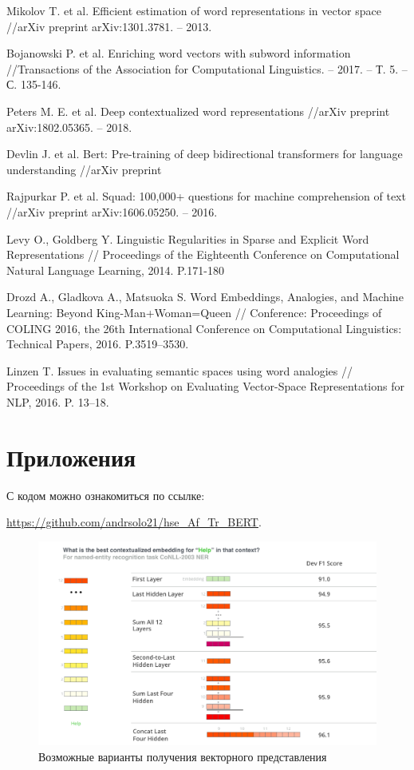\documentclass[a4paper,14pt]{article}
\begin{document}
	\begin{thebibliography}{9} 
		Mikolov T. et al. Efficient estimation of word representations in vector space //arXiv preprint arXiv:1301.3781. – 2013.	
		
		Bojanowski P. et al. Enriching word vectors with subword information //Transactions of the Association for Computational Linguistics. – 2017. – Т. 5. – С. 135-146.
		
		Peters M. E. et al. Deep contextualized word representations //arXiv preprint arXiv:1802.05365. – 2018.
		
		Devlin J. et al. Bert: Pre-training of deep bidirectional transformers for language understanding //arXiv preprint
		
		Rajpurkar P. et al. Squad: 100,000+ questions for machine comprehension of text //arXiv preprint arXiv:1606.05250. – 2016.
		
		Levy O., Goldberg Y. Linguistic Regularities in Sparse and Explicit Word 	Representations // Proceedings of the Eighteenth Conference on Computational Natural Language Learning, 2014. P.171-180
	
		
		Drozd A., Gladkova A., Matsuoka S. Word Embeddings, Analogies, and Machine Learning: Beyond King-Man+Woman=Queen // Conference: Proceedings of COLING 2016, the 26th International Conference on Computational Linguistics: Technical Papers, 2016. 
		P.3519–3530.
		
		Linzen T. Issues in evaluating semantic spaces using word analogies // Proceedings of the 1st Workshop on Evaluating Vector-Space Representations for NLP, 2016. P. 13–18.
		
		
	\end{thebibliography}
	
	
	\pagebreak
	

	\section*{Приложения}
	
	С кодом можно ознакомиться по ссылке:

 \href{https://github.com/andrsolo21/hse_Af_Tr_BERT}{https://github.com/andrsolo21/hse\_Af\_Tr\_BERT}.
	

	
\begin{figure}[H]
	\centering
	\includegraphics[width=0.7\linewidth]{image/irvrsv9mefroz7io6ilnjng3fo4}
	\caption{Возможные варианты получения векторного представления}
	\label{fig:dif_vars_get_v}
\end{figure}
\end{document}
